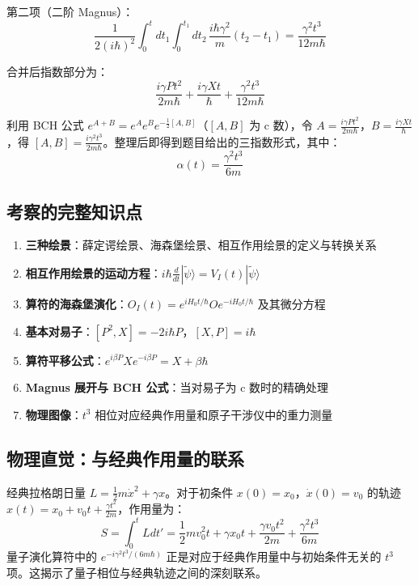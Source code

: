 第二项（二阶 Magnus）：
\[
\frac{1}{2(i\hbar)^2} \int_0^t dt_1 \int_0^{t_1} dt_2 \, \frac{i\hbar\gamma^2}{m}(t_2 - t_1) = \frac{\gamma^2 t^3}{12m\hbar}
\]

合并后指数部分为：
\[
\frac{i\gamma P t^2}{2m\hbar} + \frac{i\gamma X t}{\hbar} + \frac{\gamma^2 t^3}{12m\hbar}
\]

利用 BCH 公式 $e^{A+B} = e^A e^B e^{-\frac{1}{2}[A,B]}$（$[A,B]$ 为 c 数），令 $A = \frac{i\gamma P t^2}{2m\hbar}$，$B = \frac{i\gamma X t}{\hbar}$，得 $[A,B] = \frac{i\gamma^2 t^3}{2m\hbar}$。整理后即得到题目给出的三指数形式，其中：
\[
\alpha(t) = \frac{\gamma^2 t^3}{6m}
\]

\subsection{考察的完整知识点}

\begin{enumerate}
    \item \textbf{三种绘景}：薛定谔绘景、海森堡绘景、相互作用绘景的定义与转换关系
    \item \textbf{相互作用绘景的运动方程}：$i\hbar \frac{d}{dt}|\tilde{\psi}\rangle = V_I(t)|\tilde{\psi}\rangle$
    \item \textbf{算符的海森堡演化}：$O_I(t) = e^{iH_0 t/\hbar} O e^{-iH_0 t/\hbar}$ 及其微分方程
    \item \textbf{基本对易子}：$[P^2, X] = -2i\hbar P$，$[X, P] = i\hbar$
    \item \textbf{算符平移公式}：$e^{i\beta P} X e^{-i\beta P} = X + \beta\hbar$
    \item \textbf{Magnus 展开与 BCH 公式}：当对易子为 c 数时的精确处理
    \item \textbf{物理图像}：$t^3$ 相位对应经典作用量和原子干涉仪中的重力测量
\end{enumerate}

\subsection{物理直觉：与经典作用量的联系}

经典拉格朗日量 $L = \frac{1}{2}m\dot{x}^2 + \gamma x$。对于初条件 $x(0) = x_0$，$\dot{x}(0) = v_0$ 的轨迹 $x(t) = x_0 + v_0 t + \frac{\gamma t^2}{2m}$，作用量为：
\[
S = \int_0^t L dt' = \frac{1}{2}mv_0^2 t + \gamma x_0 t + \frac{\gamma v_0 t^2}{2m} + \frac{\gamma^2 t^3}{6m}
\]
量子演化算符中的 $e^{-i\gamma^2 t^3/(6m\hbar)}$ 正是对应于经典作用量中与初始条件无关的 $t^3$ 项。这揭示了量子相位与经典轨迹之间的深刻联系。

